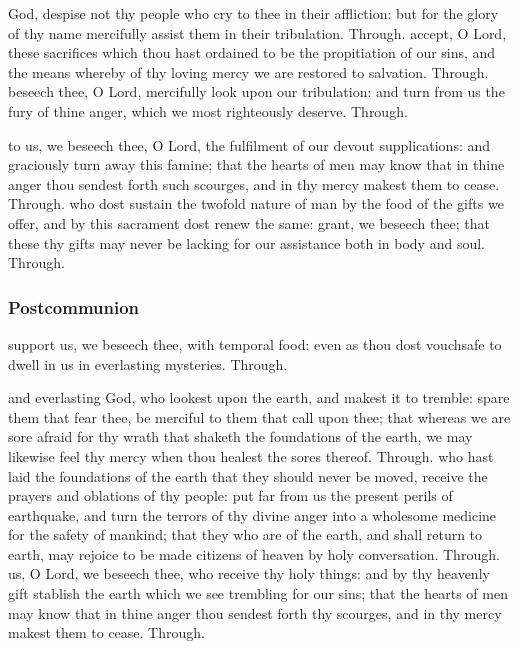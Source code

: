 \begin{multicols}{2}
 God, despise not thy people who cry to thee in their affliction: but for the glory of thy name mercifully assist them in their tribulation. Through.
 accept, O Lord, these sacrifices which thou hast ordained to be the propitiation of our sins, and the means whereby of thy loving mercy we are restored to salvation. Through.
 beseech thee, O Lord, mercifully look upon our tribulation: and turn from us the fury of thine anger, which we most righteously deserve. Through.

 to us, we beseech thee, O Lord, the fulfilment of our devout supplications: and graciously turn away this famine; that the hearts of men may know that in thine anger thou sendest forth such scourges, and in thy mercy makest them to cease. Through.
 who dost sustain the twofold nature of man by the food of the gifts we offer, and by this sacrament dost renew the same: grant, we beseech thee; that these thy gifts may never be lacking for our assistance both in body and soul. Through.
\subsubsection{Postcommunion}
 support us, we beseech thee, with temporal food: even as thou dost vouchsafe to dwell in us in everlasting mysteries. Through.

 and everlasting God, who lookest upon the earth, and makest it to tremble: spare them that fear thee, be merciful to them that call upon thee; that whereas we are sore afraid for thy wrath that shaketh the foundations of the earth, we may likewise feel thy mercy when thou healest the sores thereof. Through.
 who hast laid the foundations of the earth that they should never be moved, receive the prayers and oblations of thy people: put far from us the present perils of earthquake, and turn the terrors of thy divine anger into a wholesome medicine for the safety of mankind; that they who are of the earth, and shall return to earth, may rejoice to be made citizens of heaven by holy conversation. Through.
 us, O Lord, we beseech thee, who receive thy holy things: and by thy heavenly gift stablish the earth which we see trembling for our sins; that the hearts of men may know that in thine anger thou sendest forth thy scourges, and in thy mercy makest them to cease. Through.


\end{multicols}
